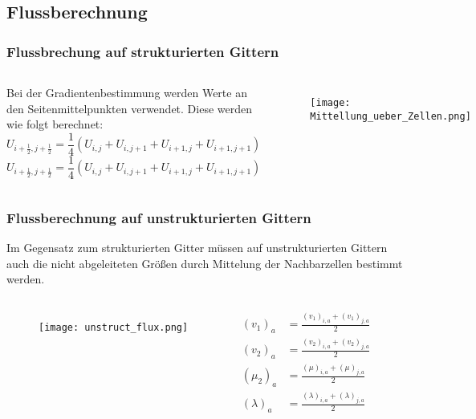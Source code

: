 \documentclass[
	11pt, %
	aspectratio=169, %
]{beamer}
\begin{document}
	\subsection{Flussberechnung}
	
	
	\begin{frame}
		\frametitle{Flussbrechung auf strukturierten Gittern}
		\begin{columns}
			
			Bei der Gradientenbestimmung werden Werte an den Seitenmittelpunkten verwendet.
			Diese werden wie folgt berechnet:
			$$U_{i+\frac{1}{2}, j + \frac{1}{2}} = \frac{1}{4} (U_{i,j}+U_{i,j+1}+U_{i+1,j}+U_{i+1,j+1}) $$
			$$U_{i+\frac{1}{2}, j + \frac{1}{2}} = \frac{1}{4} (U_{i,j}+U_{i,j+1}+U_{i+1,j}+U_{i+1,j+1})$$
			
			\begin{figure}
				\texttt{[image: Mittellung\_ueber\_Zellen.png]}
			\end{figure}
		\end{columns}
	\end{frame}
	
	\begin{frame}
		\frametitle{Flussberechnung auf unstrukturierten Gittern}
		Im Gegensatz zum strukturierten Gitter müssen auf unstrukturierten Gittern auch die nicht abgeleiteten Größen
		durch Mittelung der Nachbarzellen bestimmt werden.
		\begin{columns}
			\column{0.45\textwidth}
			\begin{figure}
				\texttt{[image: unstruct\_flux.png]}
			\end{figure}
			
			
			\column{0.45\textwidth}
			\begin{align}
			(v_1)_a &= \frac{(v_1)_{i,a}+(v_1)_{j,a}}{2} \\
			(v_2)_a &= \frac{(v_2)_{i,a}+(v_2)_{j,a}}{2} \\
			(\mu_2)_a &= \frac{(\mu)_{i,a}+(\mu)_{j,a}}{2} \\
			(\lambda)_a &= \frac{(\lambda)_{i,a}+(\lambda)_{j,a}}{2}
			\end{align}
		\end{columns}
		
	\end{frame}	
	
\end{document}
